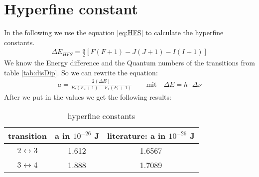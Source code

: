 \section{Hyperfine constant}
In the following we use the equation \ref{eq:HFS} to calculate the hyperfine constants.
\begin{align}
    \label{eq:HFS}
    \Delta E_{HFS} = \frac{a}{2} [F(F+1) - J(J+1) - I(I+1)]
\end{align}
We know the Energy difference and the Quantum numbers of the transitions from table \ref{tab:disDip}. So we can rewrite the equation: 
\begin{align}
    a = \frac{2(\Delta E)}{F_2(F_2+1)-F_1(F_1+1)} \qquad \text{mit} \quad \Delta E = h \cdot \Delta \nu
\end{align}
After we put in the values we get the following results: 
\begin{table}[h]
    \centering
\begin{tabular}{c|c|c}
    transition & a in $10^{-26}$ J & literature: a in $10^{-26}$ J \\
    \hline
    $2\leftrightarrow 3$ & 1.612 & 1.6567\\
    $3\leftrightarrow 4$ & 1.888 & 1.7089
\end{tabular}
\caption{hyperfine constants}
\end{table}
